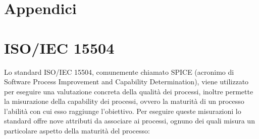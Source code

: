 \section{Appendici}
\appendix
\section{ISO/IEC 15504}
Lo standard ISO/IEC 15504, comunemente chiamato SPICE (acronimo di Software Process Improvement and Capability Determination), viene utilizzato per eseguire una valutazione concreta della qualità dei processi, inoltre permette la misurazione della capability dei processi, ovvero la maturità di un processo l'abilità con cui esso raggiunge l'obiettivo. Per eseguire queste misurazioni lo standard offre nove attributi da associare ai processi, ognuno dei quali misura un particolare aspetto della maturità del processo:
